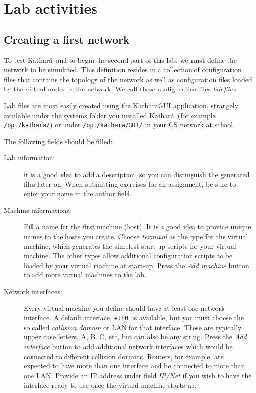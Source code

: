 \documentclass[12pt]{book}
\newcommand{\kathara}{Kathar\'a}
\begin{document}
\section{Lab activities}


\subsection{Creating a first network}\label{2nodes.se}

To test \kathara\ and to begin the second part of this lab, we must
define the network to be simulated. This definition resides in a
collection of configuration files that contains the topology of the
network as well as configuration files loaded by the virtual nodes in
the network. We call these configuration files \emph{lab files}.

Lab files are most easily created using the KatharaGUI application,
strangely available under the systems folder you installed \kathara\ 
(for example \verb$/opt/kathara/$) 
or under \verb$/opt/kathara/GUI/$ in your CS network at school. 

The following fields should be filled:
\begin{description}
\item[Lab information:] it is a good idea to add a description, so you
  can distinguish the generated files later on. When submitting
  exercises for an assignment, be sure to enter your name in the
  author field.
\item[Machine informations:] Fill a name for the first machine
  (host). It is a good idea to provide unique names to the hosts you
  create. Choose \emph{terminal} as the type for the virtual
  machine, which generates the simplest start-up scripts for your
  virtual machine. The other types allow additional configuration
  scripts to be loaded by your virtual machine at start-up. Press the
  \emph{Add machine} button to add more virtual machines to the lab. 
\item[Network interfaces:] Every virtual machine you define should
  have at least one network interface. A default interface,
  \verb$eth0$, is available, but you must choose the so called
  \emph{collision domain} or LAN for that interface. These are
  typically upper case letters, A, B, C, etc, but can also be any
  string. Press the \emph{Add interface} button to add additional
  network interfaces which would be connected to different collision
  domains. Routers, for example, are expected to have more than one
  interface and be connected to more than one LAN.  Provide an IP
  address under field \emph{IP/Net} if you wish to have the interface
  ready to use once the virtual machine starts up.
\end{description}
\end{document}
